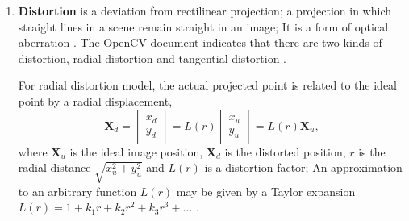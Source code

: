 \documentclass{article}
\begin{document}
\begin{enumerate}
then,

$$
\boldsymbol P_c = \begin{bmatrix} X \\ Y \\ Z \end{bmatrix} = ZK^{-1}\boldsymbol P_c = Z \begin{bmatrix} f_x^{-1} & 0 & -f_x^{-1}c_x \\ 0 & f_y^{-1} & -f_y^{-1}c_y \\ 0 & 0 & 1 \end{bmatrix} \begin{bmatrix} u \\ v \\ 1 \end{bmatrix}.
$$

As we can't get the depth information of the 2D image point, value $Z$ is unknown. Let $Z = \lambda$, we have

$$\begin{cases}
X = \lambda (\frac u{f_x} - \frac {c_x}{f_x}) \\
Y = \lambda(\frac v{f_y} - \frac {c_y}{f_y}) \\
Z = \lambda
\end{cases}.$$

And it is a a line in the 3D camera coordinate.

\item \textbf{Distortion} is a deviation from rectilinear projection; a projection in which straight lines in a scene remain straight in an image; It is a form of optical aberration \cite{ref4}. The OpenCV document indicates that there are two kinds of distortion, radial distortion and tangential distortion \cite{ref5}.

For radial distortion model, the actual projected point is related to the ideal point by a radial displacement,
$$
\boldsymbol X_d = \begin{bmatrix} x_d \\ y_d \end{bmatrix} = L(r) \begin{bmatrix} x_u \\ y_u \end{bmatrix} = L(r) \boldsymbol X_u ,
$$
where  $\boldsymbol X_u$ is the ideal image position, $\boldsymbol X_d$ is the distorted position, $r$ is the radial distance $\sqrt{x_u^2 + y_u^2}$ and  $L(r)$ is a distortion factor; An approximation to an arbitrary function $L(r)$ may be given by a Taylor expansion $L(r) = 1 + k_1r + k_2r^2 + k_3r^3 + ...$ \cite{ref6}.


\end{enumerate}
\end{document}

